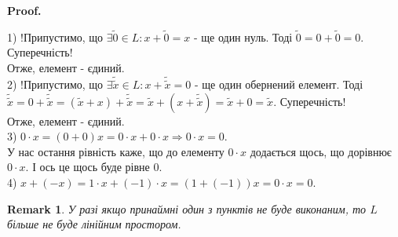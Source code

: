 \documentclass[a4paper, 10pt]{article}
\makeatletter
\def\qed{$\blacksquare$}
\theoremstyle{theoremdd}
\theoremstyle{theoremdd}
\theoremstyle{theoremdd}
\theoremstyle{theoremdd}
\theoremstyle{theoremdd}
\theoremstyle{theoremdd}
\newtheorem{remark}[theorem]{Remark}
\theoremstyle{theoremdd}
\theoremstyle{theoremdd}
\renewenvironment{proof}[1][Proof.\\]{\par
\pushQED{\hfill \qed}%
\normalfont \topsep6\p@\@plus6\p@\relax
\trivlist
\item\relax
{\bfseries
#1\@addpunct{.}}\hspace\labelsep\ignorespaces
}{%
\popQED\endtrivlist\@endpefalse
}
\makeatother
\begin{document}
	\begin{proof}
	1) !Припустимо, що $\exists \tilde{0} \in L: x + \tilde{0} = x$ - ще один нуль. Тоді $\tilde{0} = 0 + \tilde{0} = 0$. Суперечність! \\
	Отже, елемент - єдиний.
	\bigskip \\
	2) !Припустимо, що $\exists \tilde{\tilde{x}} \in L: x + \tilde{\tilde{x}} = 0$ - ще один обернений елемент. Тоді $\tilde{\tilde{x}} = 0 + \tilde{\tilde{x}} = (\tilde{x} + x) + \tilde{\tilde{x}} = \tilde{x} + (x + \tilde{\tilde{x}}) = \tilde{x} + 0 = \tilde{x}$. Суперечність! \\
	Отже, елемент - єдиний.
	\bigskip \\
	3) $0 \cdot x = (0 + 0)x = 0\cdot x + 0 \cdot x \Rightarrow 0 \cdot x = 0$. \\
	У нас остання рівність каже, що до елементу $0 \cdot x$ додається щось, що дорівнює $0 \cdot x$. І ось це щось буде рівне $0$.
	\bigskip \\
	4) $x + (-x) = 1 \cdot x + (-1) \cdot x = (1 + (-1))x = 0 \cdot x = 0$.
	\end{proof}
	
	\begin{remark}
	У разі якщо принаймні один з пунктів не буде виконаним, то $L$ більше не буде лінійним простором.
	\end{remark}
	
\end{document}
